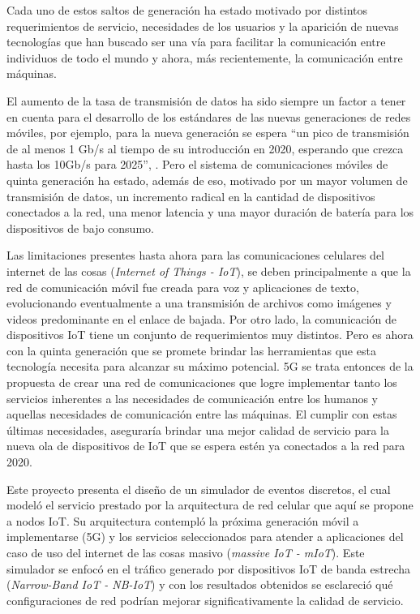 Cada uno de estos saltos de generación ha estado motivado por distintos requerimientos de servicio, necesidades de los usuarios y la aparición de nuevas tecnologías que han buscado ser una vía para facilitar la comunicación entre individuos de todo el mundo y ahora, más recientemente, la comunicación entre máquinas.\newline

El aumento de la tasa de transmisión de datos ha sido siempre un factor a tener en cuenta para el desarrollo de los estándares de las nuevas generaciones de redes móviles, por ejemplo, para la nueva generación se espera “un pico de transmisión de al menos 1 Gb/s al tiempo de su introducción en 2020, esperando que crezca hasta los 10Gb/s para 2025”, \parencite{Fettweis2016}. Pero el sistema de comunicaciones móviles de quinta generación ha estado, además de eso, motivado por un mayor volumen de transmisión de datos, un incremento radical en la cantidad de dispositivos conectados a la red, una menor latencia y una mayor duración de batería para los dispositivos de bajo consumo.\newline

Las limitaciones presentes hasta ahora para las comunicaciones celulares del internet de las cosas (\textit{Internet of Things - IoT}), se deben principalmente a que la red de comunicación móvil fue creada para voz y aplicaciones de texto, evolucionando eventualmente a una transmisión de archivos como imágenes y videos predominante en el enlace de bajada. Por otro lado, la comunicación de dispositivos IoT tiene un conjunto de requerimientos muy distintos. Pero es ahora con la quinta generación que se promete brindar las herramientas que esta tecnología necesita para alcanzar su máximo potencial. 5G se trata entonces de la propuesta de crear una red de comunicaciones que logre implementar tanto los servicios inherentes a las necesidades de comunicación entre los humanos y aquellas necesidades de comunicación entre las máquinas. El cumplir con estas últimas necesidades, aseguraría brindar una mejor calidad de servicio para la nueva ola de dispositivos de IoT que se espera estén ya conectados a la red para 2020.\newline

Este proyecto presenta el diseño de un simulador de eventos discretos, el cual modeló el servicio prestado por la arquitectura de red celular que aquí se propone a nodos IoT. Su arquitectura contempló la próxima generación móvil a implementarse (5G) y los servicios seleccionados para atender a aplicaciones del caso de uso del internet de las cosas masivo (\textit{massive IoT - mIoT}). Este simulador se enfocó en el tráfico generado por dispositivos IoT de banda estrecha (\textit{Narrow-Band IoT - NB-IoT}) y con los resultados obtenidos se esclareció qué configuraciones de red podrían mejorar significativamente la calidad de servicio.\newline

